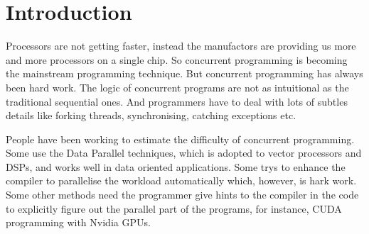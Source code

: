 \documentclass[conference]{IEEEtran}
\begin{document}
%



\section{Introduction}\label{sec:introduction}
Processors are not getting faster, instead the manufactors are providing us more and
more processors on a single chip. So concurrent programming is becoming the mainstream
programming technique. But concurrent programming has always been hard work. The logic
of concurrent programs are not as intuitional as the traditional sequential ones.
And programmers have to deal with lots of subtles details like forking threads,
synchronising, catching exceptions etc.

People have been working to estimate the difficulty of concurrent programming. Some use
the Data Parallel techniques, which is adopted to vector processors and DSPs, and
works well in data oriented applications. Some trys to enhance the compiler to parallelise
the workload automatically which, however, is hark work. Some other methods need
the programmer give hints to the compiler in the code to explicitly figure out the parallel
part of the programs, for instance, CUDA programming with Nvidia GPUs.
\end{document}
